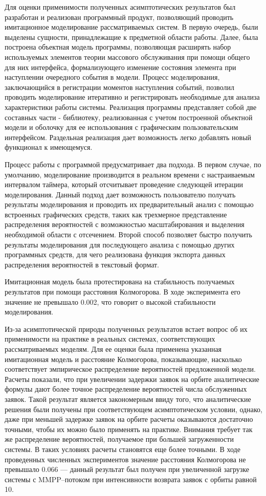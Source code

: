 Для оценки применимости полученных асимптотических результатов был разработан и реализован программный продукт, позволяющий проводить имитационное моделирование рассматриваемых систем. В первую очередь, были выделены сущности, принадлежащие к предметной области работы. Далее, была построена объектная модель программы, позволяющая расширять набор используемых элементов теории массового обслуживания при помощи общего для них интерфейса, формализующего изменение состояния элемента при наступлении очередного события в модели. Процесс моделирования, заключающийся в регистрации моментов наступления событий, позволил проводить моделирование итеративно и регистрировать необходимые для анализа характеристики работы системы. Реализация программы представляет собой две составных части - библиотеку, реализованная с учетом построенной объектной модели и оболочку для ее использования с графическим пользовательским интерфейсом. Раздельная реализация дает возможность легко добавлять новый функционал к имеющемуся.  

Процесс работы с программой предусматривает два подхода. В первом случае, по умолчанию, моделирование производится в реальном времени с настраиваемым интервалом таймера, который отсчитывает проведение следующей итерации моделирования. Данный подход дает возможность пользователю получать результаты моделирования и проводить их предварительный анализ с помощью встроенных графических средств, таких как трехмерное представление распределения вероятностей с возможностью масштабирования и выделения необходимой области с отсечением. Второй способ позволяет быстро получить результаты моделирования для последующего анализа с помощью других программных средств, для чего реализована функция экспорта данных распределения вероятностей в текстовый формат. 

Имитационная модель была протестирована на стабильность получаемых результатов при помощи расстояния Колмогорова. В ходе эксперимента его значение не превышало 0.002, что говорит о высокой стабильности моделирования.

Из-за асимптотической природы полученных результатов встает вопрос об их применимости на практике в реальных системах, соответствующих рассматриваемых моделям. Для ее оценки была применена указанная имитационная модель и расстояние Колмогорова, показывающие, насколько соответствует эмпирическое распределение вероятностей предложенной модели. Расчеты показали, что при увеличении задержки заявок на орбите аналитические формулы дают более точное распределение вероятностей числа обслуженных заявок. Такой результат является закономерным ввиду того, что аналитические решения были получены при соответствующем асимптотическом условии, однако, даже при меньшей задержке заявок на орбите расчеты оказываются достаточно точными, чтобы их можно было применять на практике. Внимания требует так же распределение вероятностей, получаемое при большей загруженности системы. В таких условиях расчеты становятся еще более точными. В ходе проведенных численных экспериментов значение расстояния Колмогорова не превышало 0.066 --- данный результат был получен при увеличенной загрузке системы с MMPP--потоком при интенсивности возврата заявок с орбиты равной 10.

